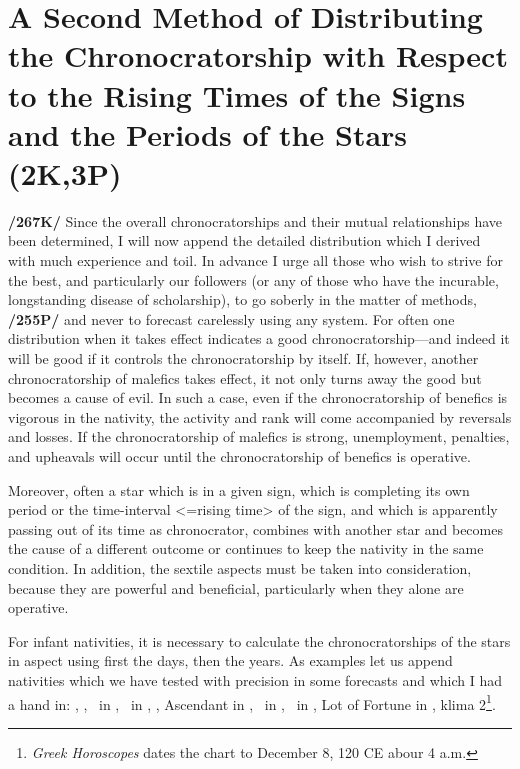 \section{A Second Method of Distributing the Chronocratorship with Respect to the Rising Times of the Signs and the Periods of the Stars (2K,3P)}

\textbf{/267K/} Since the overall chronocratorships and their mutual relationships have been determined, I will now append the detailed distribution which I derived with much experience and toil. In advance I urge all those who wish to strive for the best, and particularly our followers (or any of those who have the incurable, longstanding
disease of scholarship), to go soberly in the matter of methods, \textbf{/255P/} and never to forecast carelessly using any system. For often one distribution when it takes effect indicates a good chronocratorship—and indeed it will be good if it controls the chronocratorship by itself. If, however, another chronocratorship of malefics takes effect, it not only turns away the good but becomes a cause of evil. In such a case, even if the chronocratorship of benefics is vigorous in the nativity, the activity and rank will come accompanied by reversals and losses. If the chronocratorship of malefics is strong,
unemployment, penalties, and upheavals will occur until the chronocratorship of benefics is operative.

Moreover, often a star which is in a given sign, which is completing its own period or the time-interval <=rising time> of the sign, and which is apparently passing out of its time as chronocrator, combines with another star and becomes the cause of a different outcome or continues to keep the nativity in the same condition. In addition, the sextile aspects must be taken into consideration, because they are powerful and beneficial, particularly when they alone are operative. 

For infant nativities, it is necessary to calculate the chronocratorships of the stars in aspect using first the days, then the years. As examples let us append nativities which we have tested with precision in some forecasts and which I had a hand in: \Sun, \Moon, \Mercury\, in \Sagittarius, \Saturn\, in \Cancer, \Jupiter, Ascendant in \Scorpio, \Mars\, in \Capricorn, \Venus\, in \Aquarius, Lot of Fortune in \Scorpio, klima 2\footnote{\textit{Greek Horoscopes} dates the chart to December 8, 120 CE abour 4 a.m.}. 

